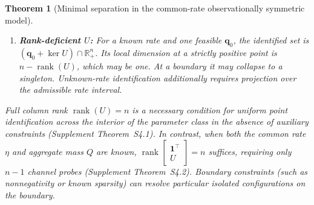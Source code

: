 \documentclass[10pt,twocolumn,letterpaper]{article}
\newtheorem{theorem}{Theorem}[section]
\theoremstyle{definition}
\theoremstyle{remark}
\begin{document}
\begin{theorem}[Minimal separation in the common-rate observationally symmetric model]
\begin{enumerate}
    \item \textbf{Rank-deficient $U$:} For a known rate and one feasible $\mathbf q_0$, the identified set is $(\mathbf q_0+\ker U)\cap\mathbb R_+^n$. Its local dimension at a strictly positive point is $n-\operatorname{rank}(U)$, which may be one. At a boundary it may collapse to a singleton. Unknown-rate identification additionally requires projection over the admissible rate interval.
\end{enumerate}
Full column rank $\operatorname{rank}(U) = n$ is a necessary condition for uniform point identification across the interior of the parameter class in the absence of auxiliary constraints (Supplement Theorem~S4.1). In contrast, when both the common rate $\eta$ and aggregate mass $Q$ are known, $\operatorname{rank}\begin{bmatrix} \mathbf{1}^\top \\ U \end{bmatrix} = n$ suffices, requiring only $n - 1$ channel probes (Supplement Theorem~S4.2). Boundary constraints (such as nonnegativity or known sparsity) can resolve particular isolated configurations on the boundary.
\end{theorem}
\end{document}
